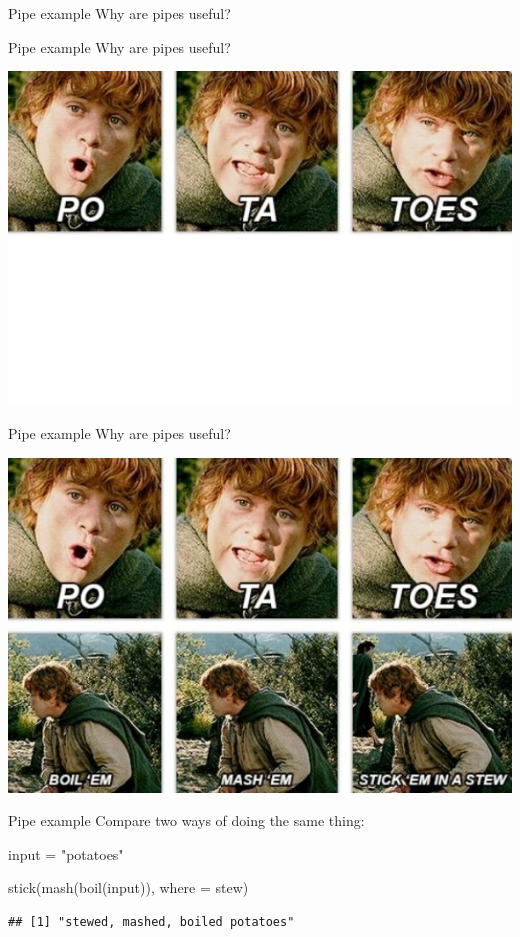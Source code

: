 \documentclass[
  ignorenonframetext,
]{beamer}
\newenvironment{Shaded}{\begin{snugshade}}{\end{snugshade}}
\newcommand{\AttributeTok}[1]{\textcolor[rgb]{0.77,0.63,0.00}{#1}}
\newcommand{\FunctionTok}[1]{\textcolor[rgb]{0.00,0.00,0.00}{#1}}
\newcommand{\NormalTok}[1]{#1}
\newcommand{\OtherTok}[1]{\textcolor[rgb]{0.56,0.35,0.01}{#1}}
\newcommand{\StringTok}[1]{\textcolor[rgb]{0.31,0.60,0.02}{#1}}
\begin{document}
\begin{frame}{Pipe example}
\protect\hypertarget{pipe-example}{}
Why are pipes useful?
\end{frame}

\begin{frame}{Pipe example}
\protect\hypertarget{pipe-example-1}{}
Why are pipes useful?

\includegraphics[width=0.75\linewidth]{images/top}
\end{frame}

\begin{frame}{Pipe example}
\protect\hypertarget{pipe-example-2}{}
Why are pipes useful?

\includegraphics[width=0.75\linewidth]{images/a83830605363b094e15f5dfb6bfa7862}
\end{frame}

\begin{frame}[fragile]{Pipe example}
\protect\hypertarget{pipe-example-3}{}
Compare two ways of doing the same thing:

\begin{Shaded}
\begin{Highlighting}[]
\NormalTok{input }\OtherTok{=} \StringTok{"potatoes"}

\FunctionTok{stick}\NormalTok{(}\FunctionTok{mash}\NormalTok{(}\FunctionTok{boil}\NormalTok{(input)), }\AttributeTok{where =} \StringTok{\textquotesingle{}stew\textquotesingle{}}\NormalTok{)}
\end{Highlighting}
\end{Shaded}

\begin{verbatim}
## [1] "stewed, mashed, boiled potatoes"
\end{verbatim}
\end{frame}
\end{document}
